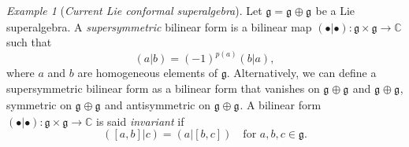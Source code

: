 \documentclass[a4paper, 12pt, reqno]{amsart}
\theoremstyle{remark}
\newtheorem{example}[theorem]{Example}
\numberwithin{equation}{subsection}
\DeclareMathOperator{\zero}{\overline{0}}
\DeclareMathOperator{\one}{\overline{1}}
\begin{document}
\begin{example}[\emph{Current Lie conformal superalgebra}]
  \label{exa:2}
  Let $\mathfrak{g} = \mathfrak{g}_{\zero} \oplus \mathfrak{g}_{\one}$ be a Lie superalgebra.
  A \emph{supersymmetric} bilinear form is a bilinear map $(\bullet| \bullet): \mathfrak{g} \times \mathfrak{g} \to \mathbb{C}$ such that
  \begin{equation*}
    (a| b) = (-1)^{p(a)}(b| a),
  \end{equation*}
  where $a$ and $b$ are homogeneous elements of $\mathfrak{g}$.
  Alternatively, we can define a supersymmetric bilinear form as a bilinear form that vanishes on $\mathfrak{g}_{\zero} \oplus \mathfrak{g}_{\one}$ and $\mathfrak{g}_{\one} \oplus \mathfrak{g}_{\zero}$, symmetric on $\mathfrak{g}_{\zero} \oplus \mathfrak{g}_{\zero}$ and antisymmetric on $\mathfrak{g}_{\one} \oplus \mathfrak{g}_{\one}$.
  A bilinear form $(\bullet| \bullet): \mathfrak{g} \times \mathfrak{g} \to \mathbb{C}$ is said \emph{invariant} if
  \begin{equation*}
    ([a, b]| c) = (a| [b, c])\quad \text{for }a, b, c \in \mathfrak{g}.
  \end{equation*}


\end{example}
\end{document}
